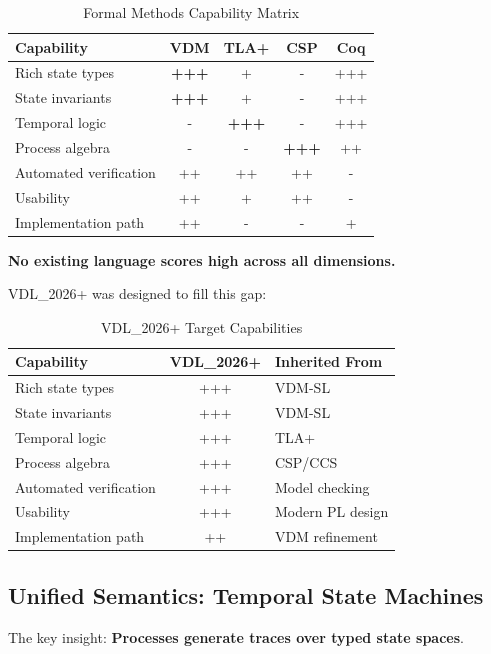 \documentclass[11pt]{article}
\begin{document}
\begin{table}[h]
\centering
\caption{Formal Methods Capability Matrix}
\begin{tabular}{|l|c|c|c|c|}
\hline
\textbf{Capability} & \textbf{VDM} & \textbf{TLA+} & \textbf{CSP} & \textbf{Coq} \\
\hline
Rich state types & \textbf{+++} & + & - & +++ \\
State invariants & \textbf{+++} & + & - & +++ \\
Temporal logic & - & \textbf{+++} & - & +++ \\
Process algebra & - & - & \textbf{+++} & ++ \\
Automated verification & ++ & ++ & ++ & - \\
Usability & ++ & + & ++ & - \\
Implementation path & ++ & - & - & + \\
\hline
\end{tabular}
\end{table}

\textbf{No existing language scores high across all dimensions.}

VDL\_2026+ was designed to fill this gap:

\begin{table}[h]
\centering
\caption{VDL\_2026+ Target Capabilities}
\begin{tabular}{|l|c|l|}
\hline
\textbf{Capability} & \textbf{VDL\_2026+} & \textbf{Inherited From} \\
\hline
Rich state types & +++ & VDM-SL \\
State invariants & +++ & VDM-SL \\
Temporal logic & +++ & TLA+ \\
Process algebra & +++ & CSP/CCS \\
Automated verification & +++ & Model checking \\
Usability & +++ & Modern PL design \\
Implementation path & ++ & VDM refinement \\
\hline
\end{tabular}
\end{table}

\subsection{Unified Semantics: Temporal State Machines}

The key insight: \textbf{Processes generate traces over typed state spaces}.
\end{document}

